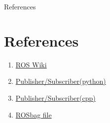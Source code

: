 \documentclass{beamer}
\begin{document}
\begin{frame}{References}
	\section{References}
	\begin{enumerate}
		\item {\href{http://wiki.ros.org/custom/images/wiki/ROS_basic_concepts.png}{ROS Wiki}}
		\item {\href{http://wiki.ros.org/rospy/Overview/}{Publisher/Subscriber(python)}}
		\item {\href{http://wiki.ros.org/roscpp/Overview}{Publisher/Subscriber(cpp)}}
		\item{\href{http://projects.csail.mit.edu/stata/downloads.php}{ROSbag file}}
	\end{enumerate}
\end{frame}
\end{document}
